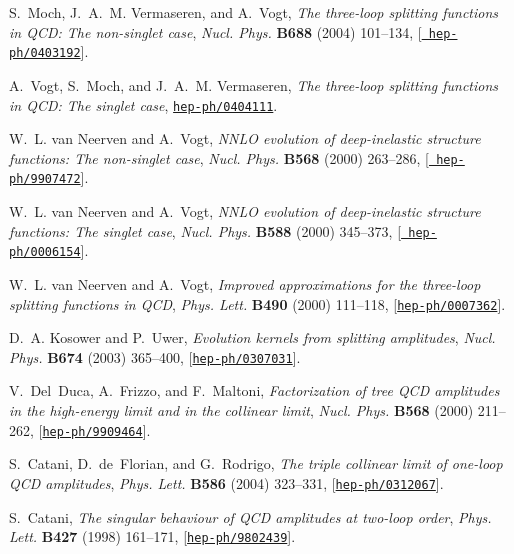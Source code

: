 \documentclass[paper,notoc,nohyper]{JHEP3}
\begin{document}
\begin{thebibliography}{10}
S.~Moch, J.~A.~M. Vermaseren, and A.~Vogt, {\it The three-loop splitting
  functions in {QCD}: The non-singlet case},  {\em Nucl. Phys.} {\bf B688}
  (2004) 101--134, [\href{http://xxx.lanl.gov/abs/hep-ph/0403192}{{\tt
  hep-ph/0403192}}].

A.~Vogt, S.~Moch, and J.~A.~M. Vermaseren, {\it The three-loop splitting
  functions in {QCD}: The singlet case},
  \href{http://xxx.lanl.gov/abs/hep-ph/0404111}{{\tt hep-ph/0404111}}.

W.~L. van Neerven and A.~Vogt, {\it {NNLO} evolution of deep-inelastic
  structure functions: The non-singlet case},  {\em Nucl. Phys.} {\bf B568}
  (2000) 263--286, [\href{http://xxx.lanl.gov/abs/hep-ph/9907472}{{\tt
  hep-ph/9907472}}].

W.~L. van Neerven and A.~Vogt, {\it {NNLO} evolution of deep-inelastic
  structure functions: The singlet case},  {\em Nucl. Phys.} {\bf B588} (2000)
  345--373, [\href{http://xxx.lanl.gov/abs/hep-ph/0006154}{{\tt
  hep-ph/0006154}}].

W.~L. van Neerven and A.~Vogt, {\it Improved approximations for the three-loop
  splitting functions in {QCD}},  {\em Phys. Lett.} {\bf B490} (2000) 111--118,
  [\href{http://xxx.lanl.gov/abs/hep-ph/0007362}{{\tt hep-ph/0007362}}].

D.~A. Kosower and P.~Uwer, {\it Evolution kernels from splitting amplitudes},
  {\em Nucl. Phys.} {\bf B674} (2003) 365--400,
  [\href{http://xxx.lanl.gov/abs/hep-ph/0307031}{{\tt hep-ph/0307031}}].

V.~Del~Duca, A.~Frizzo, and F.~Maltoni, {\it Factorization of tree {QCD}
  amplitudes in the high-energy limit and in the collinear limit},  {\em Nucl.
  Phys.} {\bf B568} (2000) 211--262,
  [\href{http://xxx.lanl.gov/abs/hep-ph/9909464}{{\tt hep-ph/9909464}}].

S.~Catani, D.~de~Florian, and G.~Rodrigo, {\it The triple collinear limit of
  one-loop {QCD} amplitudes},  {\em Phys. Lett.} {\bf B586} (2004) 323--331,
  [\href{http://xxx.lanl.gov/abs/hep-ph/0312067}{{\tt hep-ph/0312067}}].

S.~Catani, {\it The singular behaviour of {QCD} amplitudes at two-loop order},
  {\em Phys. Lett.} {\bf B427} (1998) 161--171,
  [\href{http://xxx.lanl.gov/abs/hep-ph/9802439}{{\tt hep-ph/9802439}}].


\end{thebibliography}
\end{document}
